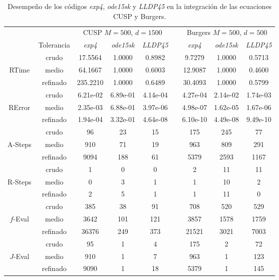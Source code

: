 \begin{table}[htb]
	\caption{Desempeño de los códigos \emph{exp4}, \emph{ode15sk} y \emph{LLDP45} en la integración de las ecuaciones  CUSP y Burgers.}
	\label{tab:num-exp-lldp-var-step:cuspburg}
	\begin{adjustbox}{width=0.8\columnwidth,center}
	\begin{tabular}{ ccccccccc }
		\hline
		& & \multicolumn{3}{c}{CUSP $M=500$, $d=1500$ } & & \multicolumn{3}{c}{Burgers $M=500$, $d=500$ }\\
		\cline{3-5} \cline{7-9}
		& Tolerancia & \emph{exp4} & \emph{ode15sk} & \emph{LLDP45} & & \emph{exp4} & \emph{ode15sk} & \emph{LLDP45} \\
		\hline
		& crudo & 17.5564 & 1.0000 & 0.8982 & & 9.7279 & 1.0000 & 0.5713 \\
		RTime  & medio & 64.1667 & 1.0000 & 0.6003 & & 12.9087 & 1.0000 & 0.4600 \\
		& refinado & 235.2210 & 1.0000 & 0.6489 & & 30.4093 & 1.0000 & 0.5799 \\
		\hline
		& crudo & 6.21e-02 & 6.89e-01 & 4.14e-04 & & 4.27e-04 & 2.14e-02 & 1.74e-03 \\
		RError  & medio & 2.35e-03 & 6.88e-01 & 3.97e-06 & & 4.98e-07 & 1.62e-05 & 1.67e-06 \\
		& refinado & 1.94e-04 & 3.32e-01 & 4.64e-08 & & 6.10e-10 & 4.49e-08 & 9.49e-10  \\
		\hline
		& crudo & 96 & 23 & 15 & & 175 & 245 & 77 \\
		A-Steps  & medio & 910 & 71 & 19 & &  963 & 809 & 291 \\
		& refinado & 9094 & 188 & 61  & & 5379 & 2593 & 1167 \\
		\hline
		& crudo & 1 & 0 & 0  & & 2 & 11 & 11 \\
		R-Steps  & medio & 0 & 3 & 1  & & 1 & 10 & 2 \\
		& refinado & 2 & 5 & 1  & & 1 & 11 & 0 \\
		\hline
		& crudo & 385 & 38 & 91  & & 708 & 520 & 529 \\
		$f$-Eval  & medio & 3642 & 101 & 121  & & 3857 & 1578 & 1759 \\
		& refinado & 36376 & 249 & 373  & & 21521 & 3021 & 7003 \\
		\hline
		& crudo & 95 & 1 & 4 &  & 175 & 2 & 72 \\
		$J$-Eval  & medio & 910 & 1 & 7 & &  963 & 1 & 123 \\
		& refinado & 9090 & 1 & 18 & &  5379 & 1 & 145 \\

\end{tabular}
\end{adjustbox}
\end{table}
